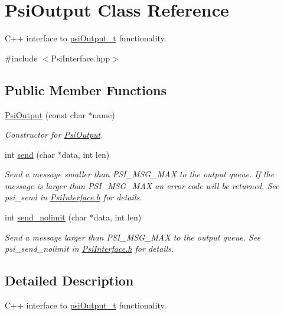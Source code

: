 \hypertarget{classPsiOutput}{}\section{Psi\+Output Class Reference}
\label{classPsiOutput}


C++ interface to \hyperlink{structpsiOutput__t}{psi\+Output\+\_\+t} functionality.  




{\ttfamily \#include $<$Psi\+Interface.\+hpp$>$}

\subsection*{Public Member Functions}
\begin{DoxyCompactItemize}
\item 
\hyperlink{classPsiOutput_a40a8752bfc87e83bb9671b737f7506aa}{Psi\+Output} (const char $\ast$name)
\begin{DoxyCompactList}\small\item\em Constructor for \hyperlink{classPsiOutput}{Psi\+Output}. \end{DoxyCompactList}\item 
int \hyperlink{classPsiOutput_a5cdad4b95c12f7ac7dcc8c4a7e7c8104}{send} (char $\ast$data, int len)
\begin{DoxyCompactList}\small\item\em Send a message smaller than P\+S\+I\+\_\+\+M\+S\+G\+\_\+\+M\+AX to the output queue. If the message is larger than P\+S\+I\+\_\+\+M\+S\+G\+\_\+\+M\+AX an error code will be returned. See psi\+\_\+send in \hyperlink{PsiInterface_8h_source}{Psi\+Interface.\+h} for details. \end{DoxyCompactList}\item 
int \hyperlink{classPsiOutput_a8cc6c40e56f1d7570d1f1dca477ade5d}{send\+\_\+nolimit} (char $\ast$data, int len)
\begin{DoxyCompactList}\small\item\em Send a message larger than P\+S\+I\+\_\+\+M\+S\+G\+\_\+\+M\+AX to the output queue. See psi\+\_\+send\+\_\+nolimit in \hyperlink{PsiInterface_8h_source}{Psi\+Interface.\+h} for details. \end{DoxyCompactList}\end{DoxyCompactItemize}


\subsection{Detailed Description}
C++ interface to \hyperlink{structpsiOutput__t}{psi\+Output\+\_\+t} functionality. 

